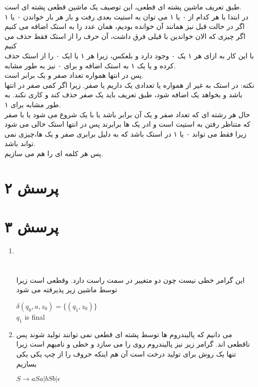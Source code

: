 \documentclass[a4paper]{article}
\begin{document}
\begin{enumerate}
طبق تعریف ماشین پشته ای قطعی، این توصیف یک ماشین قطعی پشته ای است.\\
در ابتدا با هر کدام از ۰ یا ۱ می توان به استیت بعدی رفت و بار هر بار خواندن ۰ یا ۱ اگر در حالت قبل نیز همانند آن خوانده بودیم، همان عدد را به استک اضافه می کنیم\\
اگر چیزی که الان خواندین با قیلی فرق داشت، آن حرف را از استک فقط حذف می کنیم\\
با این کار به ازای هر ۱ یک ۰ وجود دارد و بلعکس، زیرا هر ۱ یا ایک ۰ را از استک حذف کرده و یا یک ۱ به استک اضافه و برای ۰ نیز به طور مشابه.\\
پس در انتها همواره تعداد صفر و یک برابر است.\\
نکته: در استک به غیر از 
همواره یا تعدادی یک داریم یا صفر. زیرا اگر کمی صفر در انتها باشد و بخواهد یک اضافه شود، طبق تعریف باید یک صفر حذف کند و کاری نکند. به طور مشابه برای ۱.\\
حال هر رشته ای که تعداد صفر و یک آن برابر باشد یا با یک شروع می شود یا با صفر که متناظر رفتن به استیت
است و ادر  یک ها برابرند پس در انتها استک خالی می شود زیرا فقط می تواند ۰ یا ۱ در استک باشد که به دلیل برابری صفر و یک ها،چیزی نمی تواند باشد.\\
پس هر کلمه ای را هم می سازیم.
\end{enumerate}

\pagebreak
\section*{پرسش ۲}


\pagebreak
\section*{پرسش ۳}
\begin{enumerate}
\item{}
\\
\\
\\
این گرامر خطی نیست چون دو متغییر در سمت راست دارد.
وقطعی است زیرا توسط ماشین زیر پذیرفته می شود\\
\begin{latin}
$ \delta(q_0,a,z_0) = \{(q_1,z_0)\}$\\
$ q_1 $ is final
\end{latin}

\item{}
می دانیم که پالیندروم ها توسط پشته ای قطعی نمی توانند تولید شوند پس ناقطعی اند.
گرامر زیر نیز پالیندروم روی
را می سازد و خطی و نامبهم است زیرا تنها یک روش برای تولید درخت است آن هم اینکه حروف را از چپ یکی یکی بسازیم\\
\begin{latin}
$ S \rightarrow aSa|bSb|\epsilon$
\end{latin}

\end{enumerate}
\pagebreak
\end{document}
